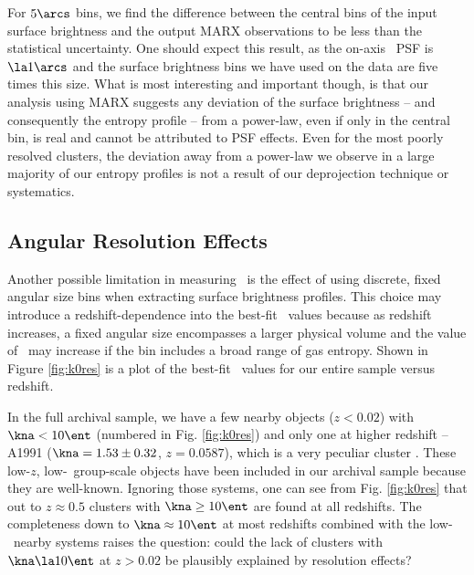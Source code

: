 For $5\arcs$ bins, we find the difference between the central bins of
the input surface brightness and the output MARX observations to be
less than the statistical uncertainty. One should expect this result,
as the on-axis \chandra\ PSF is $\la 1\arcs$ and the surface
brightness bins we have used on the data are five times this
size. What is most interesting and important though, is that our
analysis using MARX suggests any deviation of the surface brightness
-- and consequently the entropy profile -- from a power-law, even if
only in the central bin, is real and cannot be attributed to PSF
effects. Even for the most poorly resolved clusters, the deviation
away from a power-law we observe in a large majority of our entropy
profiles is not a result of our deprojection technique or systematics.

\subsection{Angular Resolution Effects}
\label{sec:entsuppangres}

Another possible limitation in measuring \kna\ is the effect of using
discrete, fixed angular size bins when extracting surface brightness
profiles. This choice may introduce a redshift-dependence into the
best-fit \kna\ values because as redshift increases, a fixed angular
size encompasses a larger physical volume and the value of \kna\ may
increase if the bin includes a broad range of gas entropy. Shown in
Figure \ref{fig:k0res} is a plot of the best-fit \kna\ values for our
entire sample versus redshift.

In the full archival sample, we have a few nearby objects ($z < 0.02$)
with $\kna < 10 \ent$ (numbered in Fig. \ref{fig:k0res}) and only one
at higher redshift -- A1991 ($\kna = 1.53 \pm 0.32$, $z = 0.0587$),
which is a very peculiar cluster \citep{2004ApJ...613..180S}. These
low-$z$, low-\kna\ group-scale objects have been included in our
archival sample because they are well-known. Ignoring those systems,
one can see from Fig. \ref{fig:k0res} that out to $z \approx 0.5$
clusters with $\kna \geq 10 \ent$ are found at all redshifts. The
completeness down to $\kna \approx 10 \ent$ at most redshifts combined
with the low-\kna\ nearby systems raises the question: could the lack
of clusters with $\kna \la 10 \ent$ at $z > 0.02$ be plausibly
explained by resolution effects?

